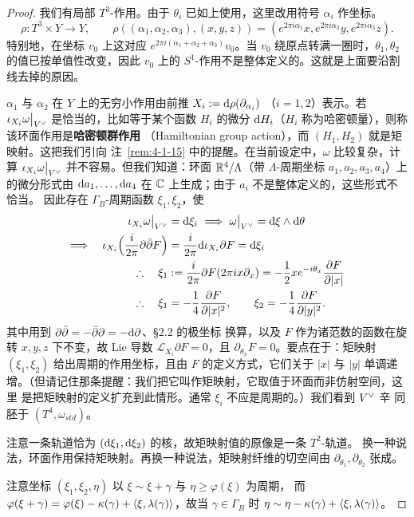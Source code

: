 \begin{proof}
我们有局部 $T^3$-作用。由于 $\theta_i$ 已如上使用，这里改用符号 $\alpha_i$ 作坐标。
\[
\rho\colon T^3\times Y\to Y,\qquad
\rho((\alpha_1,\alpha_2,\alpha_3),(x,y,z))
=(e^{2\pi i\alpha_1}x,e^{2\pi i\alpha_2}y,e^{2\pi i\alpha_3}z).
\]
特别地，在坐标 $v_0$ 上这对应 $e^{2\pi i(\alpha_1+\alpha_2+\alpha_3)}v_0$。当 $v_0$
绕原点转满一圈时，$\theta_1,\theta_2$ 的值已按单值性改变，因此 $v_0$ 上的
$S^1$-作用不是整体定义的。这就是上面要沿割线去掉的原因。

$\alpha_1$ 与 $\alpha_2$ 在 $Y$ 上的无穷小作用由前推 $X_i:=\mathrm{d}\rho(\partial_{\alpha_i})$
（$i=1,2$）表示。若 $\iota_{X_i}{\omega}\big|_{V^{\vee}}$ 是恰当的，比如等于某个函数
$H_i$ 的微分 $\mathrm{d} H_i$（$H_i$ 称为哈密顿量），则称该环面作用是\textbf{哈密顿群作用}
（Hamiltonian group action），而 $(H_1,H_2)$ 就是矩映射。这把我们引向
注~\ref{rem:4-1-15} 中的提醒。在当前设定中，$\omega$
比较复杂，计算 $\iota_{X_i}{\omega}\big|_{V^{\vee}}$ 并不容易。但我们知道：环面
$\mathbb{R}^4/\Lambda$（带 $\Lambda$-周期坐标 $a_1,a_2,a_3,a_4$）上的微分形式由
$\mathrm{d} a_1,\dots,\mathrm{d} a_4$ 在 $\mathbb{C}$ 上生成；由于 $a_i$ 不是整体定义的，这些形式不恰当。
因此存在 $\Gamma_B$-周期函数 $\xi_1,\xi_2$，使
\[
\begin{aligned}
\iota_{X_i}{\omega}\big|_{V^{\vee}}&=\mathrm{d}\xi_i
\ \Longrightarrow\ {\omega}\big|_{V^{\vee}}=\mathrm{d}\xi\wedge\mathrm{d}\theta\\
\Longrightarrow\quad
\iota_{X_i}\Big(\frac{i}{2\pi}\partial\bar\partial F\Big)
&=\frac{i}{2\pi}\mathrm{d}\iota_{X_i}\partial F=\mathrm{d}\xi_i\\
\therefore\quad \xi_1&:=\frac{i}{2\pi}\partial F(2\pi ix\partial_x)
=-\frac{1}{2}xe^{-i\theta_x}\frac{\partial F}{\partial|x|}\\
\therefore\quad \xi_1&=-\frac{1}{4}\frac{\partial F}{\partial|x|^2},
\qquad
\xi_2=-\frac{1}{4}\frac{\partial F}{\partial|y|^2}.
\end{aligned}
\]
其中用到 $\partial\bar\partial=-\bar\partial\partial=-\mathrm{d}\partial$、§2.2 的极坐标
换算，以及 $F$ 作为诸范数的函数在旋转 $x,y,z$ 下不变，故 Lie 导数
$\mathcal{L}_{X_i}\partial F=0$，且 $\partial_{\theta_x}F=0$。要点在于：矩映射
$(\xi_1,\xi_2)$ 给出周期的作用坐标，且由 $F$ 的定义方式，它们关于 $|x|$ 与 $|y|$
单调递增。（但请记住那条提醒：我们把它叫作矩映射，它取值于环面而非仿射空间，这里
是把矩映射的定义扩充到此情形。通常 $\xi_i$ 不应是周期的。）我们看到 $V^{\vee}$ 辛
同胚于 $(T^4,\omega_{std})$。

注意一条轨道恰为 $(\mathrm{d}\xi_1,\mathrm{d}\xi_2)$ 的核，故矩映射值的原像是一条 $T^2$-轨道。
换一种说法，环面作用保持矩映射。再换一种说法，矩映射纤维的切空间由
$\partial_{\theta_1},\partial_{\theta_2}$ 张成。

注意坐标 $(\xi_1,\xi_2,\eta)$ 以 $\xi\sim\xi+\gamma$ 与 $\eta\ge\varphi(\xi)$ 为周期，
而 $\varphi(\xi+\gamma)=\varphi(\xi)-\kappa(\gamma)+\langle \xi,\lambda(\gamma)\rangle$，故当
$\gamma\in\Gamma_B$ 时 $\eta\sim\eta-\kappa(\gamma)+\langle \xi,\lambda(\gamma)\rangle$。
\end{proof}

